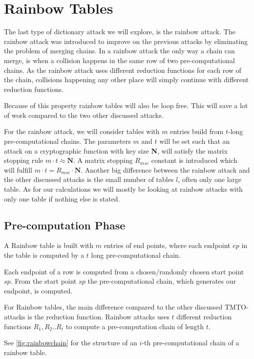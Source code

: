 \section{Rainbow Tables}
\label{sec:raintheory}

The last type of dictionary attack we will explore, is the rainbow
attack. The rainbow attack was introduced to improve on the previous
attacks by eliminating the problem of merging chains. In a rainbow
attack the only way a chain can merge, is when a collision happens in
the same row of two pre-computational chains. As the rainbow attack uses different
reduction functions for each row of the chain, collisions happening
any other place will simply continue with different reduction
functions.

Because of this property rainbow tables will also be loop free. This
will save a lot of work compared to the two other discussed attacks.

For the rainbow attack, we will consider tables with $m$ entries build
from $t$-long pre-computational chains. The parameters $m$ and $t$
will be set such that an attack on a cryptographic
function with key size \textbf{N}, will satisfy the matrix
stopping rule $m \cdot t \approx \textbf{N}$. A matrix stopping $R_{msc}$
constant is introduced which will fulfill $m\cdot t = R_{msc} \cdot
\textbf{N}$. Another big difference between the rainbow attack and the
other discussed attacks is the small number of tables $l$, often only
one large table. As for our calculations we will mostly be looking at
rainbow attacks with only one table if nothing else is stated.

\subsection{Pre-computation Phase}

A Rainbow table is built with $m$ entries of end points, where each endpoint
$ep$ in the table is computed by a $t$ long pre-computational chain.

Each endpoint of a row is computed from a chosen/randomly chosen
start point $sp$. From the start point $sp$ the pre-computational chain,
which generates our endpoint, is computed.

For Rainbow tables, the main difference compared to the other
discussed TMTO-attacks is the reduction function. Rainbow attacks
uses $t$ different reduction functions $R_1,R_2..R_t$ to compute a pre-computation
chain of length $t$.

See \ref{fig:rainbowchain} for the structure of an $i$-th
pre-computational chain of a rainbow table.

